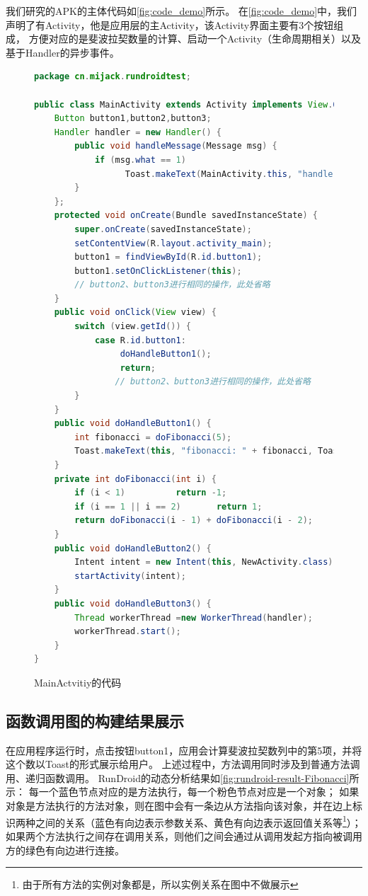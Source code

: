 我们研究的APK的主体代码如\autoref{fig:code_demo}所示。
在\autoref{fig:code_demo}中，我们声明了有Activity，他是应用层的主Activity，该Activity界面主要有3个按钮组成，
方便对应的是斐波拉契数量的计算、启动一个Activity（生命周期相关）以及基于Handler的异步事件。



\begin{figure}[!h]
	\centering
	\begin{lstlisting}[language=Java]
package cn.mijack.rundroidtest;

public class MainActivity extends Activity implements View.OnClickListener {
	Button button1,button2,button3;
	Handler handler = new Handler() {
		public void handleMessage(Message msg) {
			if (msg.what == 1)   
			      Toast.makeText(MainActivity.this, "handle", Toast.LENGTH_SHORT).show();
		}
	};
	protected void onCreate(Bundle savedInstanceState) {
		super.onCreate(savedInstanceState);
		setContentView(R.layout.activity_main);
		button1 = findViewById(R.id.button1);
		button1.setOnClickListener(this);   	
		// button2、button3进行相同的操作，此处省略
	}
	public void onClick(View view) {
		switch (view.getId()) {
			case R.id.button1:		
			     doHandleButton1();		
			     return;				 	
				// button2、button3进行相同的操作，此处省略
		}
	}
	public void doHandleButton1() {
		int fibonacci = doFibonacci(5);
		Toast.makeText(this, "fibonacci: " + fibonacci, Toast.LENGTH_SHORT).show();
	}
	private int doFibonacci(int i) {
		if (i < 1)			return -1;
		if (i == 1 || i == 2) 		return 1;
		return doFibonacci(i - 1) + doFibonacci(i - 2);
	}
	public void doHandleButton2() {
		Intent intent = new Intent(this, NewActivity.class);
		startActivity(intent);
	}
	public void doHandleButton3() {
		Thread workerThread =new WorkerThread(handler);
		workerThread.start();
	}
}\end{lstlisting}
	\caption{MainActvitiy的代码}
	\label{fig:code_demo}
\end{figure}



\subsection{函数调用图的构建结果展示}

在应用程序运行时，点击按钮button1，应用会计算斐波拉契数列中的第5项，并将这个数以Toast的形式展示给用户。
上述过程中，方法调用同时涉及到普通方法调用、递归函数调用。
RunDroid的动态分析结果如\autoref{fig:rundroid-result-Fibonacci}所示：
每一个蓝色节点对应的是方法执行，每一个粉色节点对应是一个对象；
如果对象是方法执行的方法对象，则在图中会有一条边从方法指向该对象，并在边上标识两种之间的关系（蓝色有向边表示参数关系、黄色有向边表示返回值关系等\footnote{由于所有方法的实例对象都是，所以实例关系在图中不做展示}）；
如果两个方法执行之间存在调用关系，则他们之间会通过从调用发起方指向被调用方的绿色有向边进行连接。

